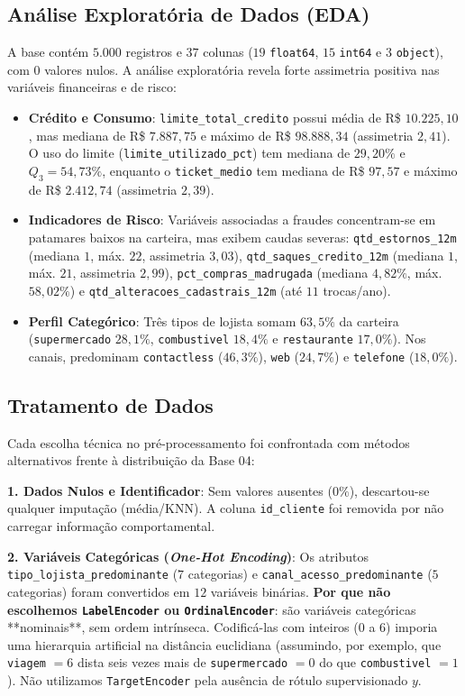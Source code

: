 \documentclass[10pt,twocolumn]{article}
\begin{document}
\subsection{Análise Exploratória de Dados (EDA)}

A base contém $5.000$ registros e $37$ colunas ($19$ \texttt{float64}, $15$ \texttt{int64} e $3$ \texttt{object}), com $0$ valores nulos. A análise exploratória revela forte assimetria positiva nas variáveis financeiras e de risco:
\begin{itemize}
  \item \textbf{Crédito e Consumo}: \texttt{limite\_total\_credito} possui média de R\$ $10.225,10$, mas mediana de R\$ $7.887,75$ e máximo de R\$ $98.888,34$ (assimetria $2,41$). O uso do limite (\texttt{limite\_utilizado\_pct}) tem mediana de $29,20\%$ e $Q_3 = 54,73\%$, enquanto o \texttt{ticket\_medio} tem mediana de R\$ $97,57$ e máximo de R\$ $2.412,74$ (assimetria $2,39$).
  \item \textbf{Indicadores de Risco}: Variáveis associadas a fraudes concentram-se em patamares baixos na carteira, mas exibem caudas severas: \texttt{qtd\_estornos\_12m} (mediana $1$, máx. $22$, assimetria $3,03$), \texttt{qtd\_saques\_credito\_12m} (mediana $1$, máx. $21$, assimetria $2,99$), \texttt{pct\_compras\_madrugada} (mediana $4,82\%$, máx. $58,02\%$) e \texttt{qtd\_alteracoes\_cadastrais\_12m} (até $11$ trocas/ano).
  \item \textbf{Perfil Categórico}: Três tipos de lojista somam $63,5\%$ da carteira (\texttt{supermercado} $28,1\%$, \texttt{combustivel} $18,4\%$ e \texttt{restaurante} $17,0\%$). Nos canais, predominam \texttt{contactless} ($46,3\%$), \texttt{web} ($24,7\%$) e \texttt{telefone} ($18,0\%$).
\end{itemize}

\subsection{Tratamento de Dados}

Cada escolha técnica no pré-processamento foi confrontada com métodos alternativos frente à distribuição da Base 04:

\textbf{1. Dados Nulos e Identificador}: Sem valores ausentes ($0\%$), descartou-se qualquer imputação (média/KNN). A coluna \texttt{id\_cliente} foi removida por não carregar informação comportamental.

\textbf{2. Variáveis Categóricas (\textit{One-Hot Encoding})}: Os atributos \texttt{tipo\_lojista\_predominante} ($7$ categorias) e \texttt{canal\_acesso\_predominante} ($5$ categorias) foram convertidos em $12$ variáveis binárias. \textbf{Por que não escolhemos \texttt{LabelEncoder} ou \texttt{OrdinalEncoder}}: são variáveis categóricas **nominais**, sem ordem intrínseca. Codificá-las com inteiros ($0$ a $6$) imporia uma hierarquia artificial na distância euclidiana (assumindo, por exemplo, que \texttt{viagem} $= 6$ dista seis vezes mais de \texttt{supermercado} $= 0$ do que \texttt{combustivel} $= 1$). Não utilizamos \texttt{TargetEncoder} pela ausência de rótulo supervisionado $y$.
\end{document}

